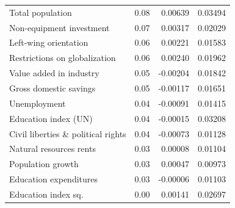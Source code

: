 \documentclass[preprint, nonatbib, 10pt]{elsarticle}
\begin{document}
\begin{table}[ht!]
\begin{tabular}{lrrr}
  Total population & 0.08 & 0.00639 & 0.03494 \\ 
  Non-equipment investment & 0.07 & 0.00317 & 0.02029 \\ 
  Left-wing orientation & 0.06 & 0.00221 & 0.01583 \\ 
  Restrictions on globalization & 0.06 & 0.00240 & 0.01962 \\
  Value added in industry & 0.05 & -0.00204 & 0.01842 \\ 
  Gross domestic savings & 0.05 & -0.00117 & 0.01651 \\
  Unemployment & 0.04 & -0.00091 & 0.01415 \\ 
  Education index (UN) & 0.04 & -0.00015 & 0.03208 \\
  Civil liberties \& political rights & 0.04 & -0.00073 & 0.01128 \\ 
  Natural resources rents & 0.03 & 0.00008 & 0.01104 \\ 
  Population growth & 0.03 & 0.00047 & 0.00973 \\
  Education expenditures & 0.03 & -0.00006 & 0.01103 \\ 
  Education index sq. & 0.00 & 0.00141 & 0.02697 \\
       \bottomrule
   \end{tabular}
\end{table}
\clearpage
\end{document}
